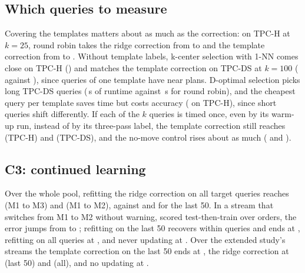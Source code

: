\documentclass{article}
\begin{document}
\subsection{Which queries to measure}
Covering the templates matters about as much as the correction: on TPC-H at $k=25$, round robin takes the ridge correction from \PLTpchKTwoFiveRandomRidge{} to \PLTpchKTwoFiveRoundRobinRidge{} and the template correction from \PLTpchKTwoFiveRandomLowdimTemplate{} to \PLTpchKTwoFiveRoundRobinLowdimTemplate. Without template labels, k-center selection with 1-NN comes close on TPC-H (\PLTpchKTwoFiveKCenterOneNn) and matches the template correction on TPC-DS at $k=100$ (\PLTpcdsKOneZeroZeroKCenterOneNn{} against \PLTpcdsKOneZeroZeroRoundRobinLowdimTemplate), since queries of one template have near plans. D-optimal selection picks long TPC-DS queries (\PLTpcdsKOneZeroZeroDOptimalCalibrationS\,s of runtime against \PLTpcdsKOneZeroZeroRoundRobinCalibrationS\,s for round robin), and the cheapest query per template saves time but costs accuracy (\PLTpchKTwoFiveRrCheapLowdimTemplate{} on TPC-H), since short queries shift differently. If each of the $k$ queries is timed once, even by its warm-up run, instead of by its three-pass label, the template correction still reaches \SingleTpchFirstLowdimTemplate{} (TPC-H) and \SingleTpcdsFirstLowdimTemplate{} (TPC-DS), and the no-move control rises about as much (\SingleTpchFirstControl{} and \SingleTpcdsFirstControl).

\subsection{C3: continued learning}
Over the whole pool, refitting the ridge correction on all target queries reaches \CThreeMOneMThreeAllPool{} (M1 to M3) and \CThreeMOneMTwoAllPool{} (M1 to M2), against \CThreeMOneMThreeLastPool{} and \CThreeMOneMTwoLastPool{} for the last 50. In a stream that switches from M1 to M2 without warning, scored test-then-train over \EvalStreamOrders{} orders, the error jumps from \CThreeStreamLastBefore{} to \CThreeStreamLastAfter; refitting on the last 50 recovers within \CThreeStreamLastRecover{} queries and ends at \CThreeStreamLastFinal, refitting on all queries at \CThreeStreamAllFinal, and never updating at \CThreeStreamNeverFinal. Over the extended study's \StreamPairs{} streams the template correction on the last 50 ends at \StreamFinalLowdimTemplateLastFiveZero, the ridge correction at \StreamFinalRidgeLastFiveZero{} (last 50) and \StreamFinalRidgeAll{} (all), and no updating at \StreamFinalNever.
\end{document}
